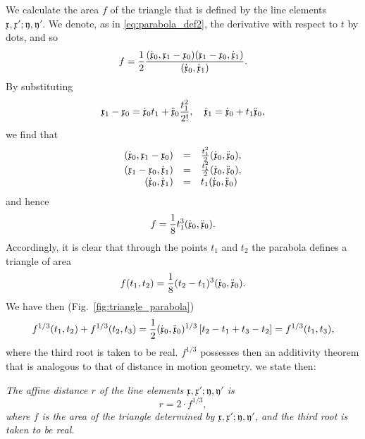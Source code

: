 \documentclass[11pt]{book} \usepackage{amssymb}
\newcommand{\myvec}[1]{\mathfrak{#1}}
\newcommand{\vecx}{\myvec{x}}
\newcommand{\vecy}{\myvec{y}}
\newcommand{\vecderiv}[1]{\dot{\myvec{#1}}}
\newcommand{\vecderivv}[1]{\ddot{\myvec{#1}}}
\begin{document}
We calculate the area $f$ of the triangle that is defined by the line elements
$\vecx,\vecx';\vecy,\vecy'$. We denote, as in 
\eqref{eq:parabola_def2}, the derivative with respect to $t$ by dots,
and so
\begin{equation}
  \label{eq:triangle_area_vector}
  f={1\over 2}{(\vecderiv{x}_0,\vecx_1-\vecx_0)(\vecx_1-\vecx_0,\vecderiv{x}_1)
    \over (\vecderiv{x}_0,\vecderiv{x}_1)}.
\end{equation}
By substituting 
\begin{equation*} 
  \vecx_1-\vecx_0=\vecderiv{x}_0t_1+\vecderivv{x}_0{t_1^2\over 2!},\quad \vecderiv{x}_1=\vecderiv{x}_0+t_1\vecderivv{x}_0,
\end{equation*}
we find that
\begin{equation*}
  \begin{array}{rcl}
    (\vecderiv{x}_0,\vecx_1-\vecx_0)&=&{t_1^2\over 2}(\vecderiv{x}_0,\vecderivv{x}_0),\\
    (\vecx_1-\vecx_0,\vecderiv{x}_1)&=&{t_1^2\over 2}(\vecderiv{x}_0,\vecderivv{x}_0),\\
    (\vecderiv{x}_0,\vecderiv{x}_1)&=&t_1(\vecderiv{x}_0,\vecderivv{x}_0)
  \end{array}
\end{equation*}
and hence
\begin{equation}
  \label{eq:triangle_area_parabola}
  f={1\over 8}t_1^3(\vecderiv{x}_0,\vecderivv{x}_0).
\end{equation}
Accordingly, it is clear that through the points $t_1$ and $t_2$ the parabola
defines a triangle of area
\begin{equation}
  \label{eq:parabola_defines_area}
  f(t_1,t_2)={1\over 8}(t_2-t_1)^3(\vecderiv{x}_0,\vecderivv{x}_0).
\end{equation}
We have then (Fig.~\ref{fig:triangle_parabola})
\begin{equation}
  \label{eq:affine_distance_additive}
  f^{1/3}(t_1,t_2)+f^{1/3}(t_2,t_3)={1\over 2}(\vecderiv{x}_0,\vecderivv{x}_0)^{1/3}\left[t_2-t_1+t_3-t_2\right]=f^{1/3}(t_1,t_3),
\end{equation}
where the third root is taken to be real. $f^{1/3}$ possesses then an 
additivity theorem that is analogous to that of distance in motion geometry. we
state then:

{\em The affine distance $r$ of the line elements 
$\vecx,\vecx';\vecy,\vecy'$ is 
$$r=2\cdot f^{1/3},$$
where $f$ is the area of the triangle determined by 
$\vecx,\vecx';\vecy,\vecy'$, and the third root is taken to be
real.}
\end{document}

